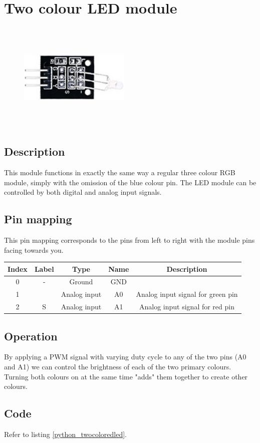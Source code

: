 \section{Two colour LED module}
\begin{figure}[H]
    \centering
    \includegraphics[angle=0, keepaspectratio=true, scale=1, width=200px, height=200px]{images/2_led.jpg}
\end{figure}
\subsection*{Description}
This module functions in exactly the same way a regular three colour RGB module, simply with the omission of the blue colour pin. The LED module can be controlled by both digital and analog input signals.
\subsection*{Pin mapping}
This pin mapping corresponds to the pins from left to right with the module pins facing towards you.
\begin{table}[H]
    \centering
    \begin{tabular}{|c|c|c|c|c|}
    \hline
    Index &Label &Type &Name &Description\\ \hline
    0 &- &Ground &GND &\\ \hline
    1 & &Analog input  &A0 &Analog input signal for green pin \\ \hline
    2 &S &Analog input  &A1 &Analog input signal for red pin \\ \hline
    \end{tabular}
\end{table}
\subsection*{Operation}
By applying a PWM signal with varying duty cycle to any of the two pins (A0 and A1) we can control the brightness of each of the two primary colours. Turning both colours on at the same time "adds" them together to create other colours.
\subsection*{Code}
Refer to listing \ref{python_twocoloredled}.
%